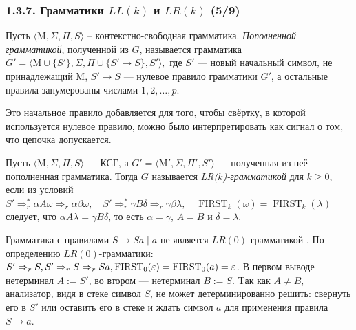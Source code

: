 \documentclass[mathserif,12pt,aspectratio=169]{beamer}
\renewcommand{\index}[1]{}
\def\odmkey#1#2{{\it\color{red} #1}\index{#2}}
\def\Assign{\operatorname{:=}}
\let\ge\geqslant
\begin{document}
\begin{frame}
\frametitle{1.3.7. Грамматики $LL(k)$ и $LR(k)$ (5/9)}
Пусть $\langle \mathrm{M}, \Sigma, \Pi, S \rangle$ -- контекстно-свободная грамматика. 
\odmkey{Пополненной грамматикой}{Грамматика!Пополненная}, полученной из $G$, называется грамматика 
$
G' = \langle \mathrm{M} \cup \{ S' \}, \Sigma, \Pi \cup \{ S' \to S \}, S' \rangle,
$
где $S'$ --- новый начальный символ, не принадлежащий $\mathrm{M}$, $S' \to S$ --- нулевое правило грамматики $G'$, 
а остальные правила занумерованы числами $1, 2, \ldots, p$. 
\begin{remark} Это начальное правило добавляется для того, чтобы свёртку, в которой 
используется нулевое правило, можно было интерпретировать как сигнал о том, 
что цепочка допускается.
\end{remark}

Пусть $\langle \mathrm{M}, \Sigma, \Pi, S \rangle$ --- КСГ, 
а $G' = \langle \mathrm{M}', \Sigma, \Pi', S'\rangle $ --- полученная из неё пополненная грамматика. Тогда 
$G$ называется \odmkey{LR($k$)-грамматикой}{Грамматика!$LR(k)$} для $k \ge 0$, 
если из условий\\
$
S' \Rightarrow^*_{r} \alpha A \omega \Rightarrow_{r} \alpha \beta \omega,\quad
S' \Rightarrow^*_{r} \gamma B \delta \Rightarrow_{r} \gamma \beta \lambda, \quad
\operatorname{FIRST}_k(\omega) = \operatorname{FIRST}_k(\lambda)
$
следует, что $\alpha A \lambda = \gamma B \delta$, то есть $\alpha = \gamma$, $A = B$ и $\delta = \lambda$.
\begin{example}
Грамматика с правилами \(S \to Sa \mid a \) не  является  \(LR(0)\)-грамматикой . 
По определению \(LR(0)\)-грамматики: 
\(
S' \Rightarrow_{r}S, \space
S' \Rightarrow_{r}S \Rightarrow_{r}Sa, \space
\operatorname{FIRST}_0(\varepsilon) = \operatorname{FIRST}_0(a) = \varepsilon
\).
В первом выводе нетерминал $A \Assign S'$, во втором --- нетерминал $B \Assign S$. Tак как $A \neq B$, анализатор, видя в стеке символ $S$, не может детерминированно решить: свернуть его в $S'$ или
оставить его в стеке и ждать символ $a$ для применения правила \(S \to a \).
\end{example}
\end{frame}
\end{document}

